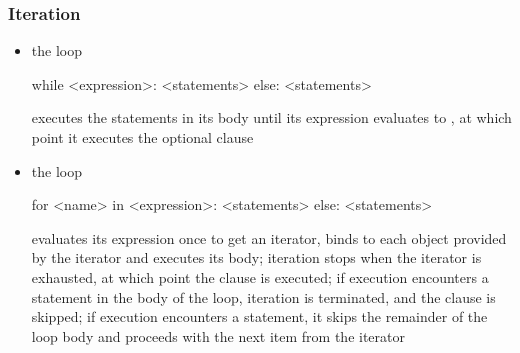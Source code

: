 \begin{frame}[fragile]
%
  \frametitle{Iteration}
%
  \begin{itemize}
%
  \item the  loop
    \begin{ipython}{}
      while <expression>:
          <statements>
      else:
          <statements>
    \end{ipython}
    executes the statements in its body until its expression evaluates to , at
    which point it executes the optional  clause
%
  \item the  loop 
    \begin{ipython}{}
      for <name> in <expression>:
          <statements>
      else:
          <statements>
    \end{ipython}
    evaluates its expression once to get an iterator, binds  to each object
    provided by the iterator and executes its body; iteration stops when the iterator is
    exhausted, at which point the  clause is executed; if execution encounters a
     statement in the body of the loop, iteration is terminated, and the
     clause is skipped; if execution encounters a  statement,
    it skips the remainder of the loop body and proceeds with the next item from the iterator
%
  \end{itemize}
%
\end{frame}

